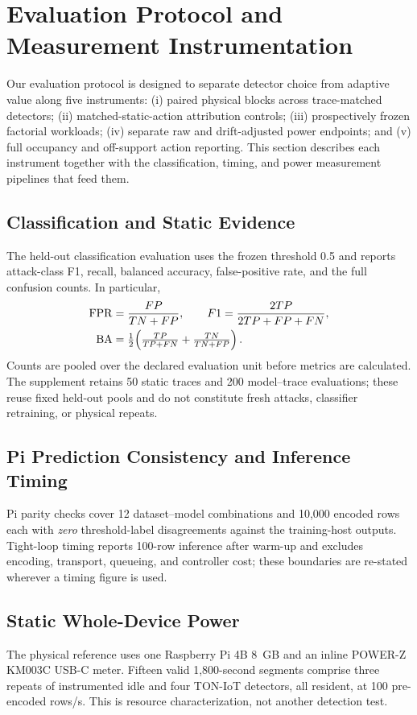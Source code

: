 \section{Evaluation Protocol and Measurement Instrumentation}
\label{sec:eval}
Our evaluation protocol is designed to separate detector choice from adaptive value along five instruments: (i) paired physical blocks across trace-matched detectors; (ii) matched-static-action attribution controls; (iii) prospectively frozen factorial workloads; (iv) separate raw and drift-adjusted power endpoints; and (v) full occupancy and off-support action reporting. This section describes each instrument together with the classification, timing, and power measurement pipelines that feed them.

\subsection{Classification and Static Evidence}
The held-out classification evaluation uses the frozen threshold 0.5 and reports attack-class F1, recall, balanced accuracy, false-positive rate, and the full confusion counts. In particular,
\begin{align}
    \operatorname{FPR} &= \frac{FP}{TN+FP},\qquad F1 = \frac{2TP}{2TP+FP+FN},\\
    \operatorname{BA} &= \tfrac12\!\left(\tfrac{TP}{TP+FN}+\tfrac{TN}{TN+FP}\right).
\end{align}
Counts are pooled over the declared evaluation unit before metrics are calculated. The supplement retains 50 static traces and 200 model--trace evaluations; these reuse fixed held-out pools and do not constitute fresh attacks, classifier retraining, or physical repeats.

\subsection{Pi Prediction Consistency and Inference Timing}
Pi parity checks cover 12 dataset--model combinations and 10{,}000 encoded rows each with \emph{zero} threshold-label disagreements against the training-host outputs. Tight-loop timing reports 100-row inference after warm-up and excludes encoding, transport, queueing, and controller cost; these boundaries are re-stated wherever a timing figure is used.

\subsection{Static Whole-Device Power}
The physical reference uses one Raspberry Pi 4B 8~GB and an inline POWER-Z KM003C USB-C meter. Fifteen valid 1{,}800-second segments comprise three repeats of instrumented idle and four TON-IoT detectors, all resident, at 100 pre-encoded rows/s. This is resource characterization, not another detection test.

